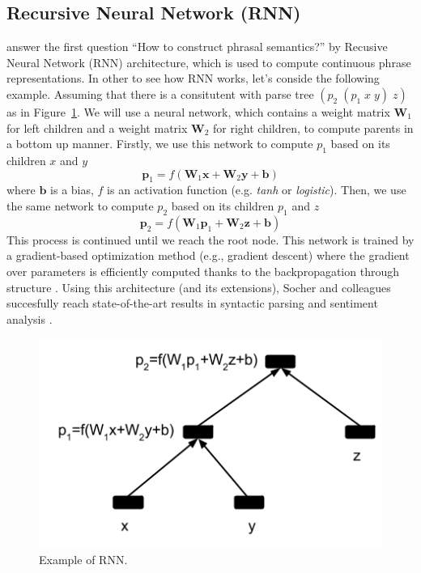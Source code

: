\documentclass[11pt]{article}
\begin{document}
\subsection{Recursive Neural Network (RNN)}
\label{subsection rnn}
\cite{socher_learning_2010} answer the first question ``How to construct phrasal semantics?'' 
by Recusive Neural Network (RNN) architecture, 
which is used to compute continuous phrase representations. In other to see how RNN works, 
let's conside the following example. Assuming that there is a consitutent with parse
tree $(p_2 \; (p_1 \; x \; y) \; z)$ as in Figure~\ref{figure rnn}. We will use a neural network, 
which contains a weight matrix $\mathbf{W}_1$ for left children and a weight matrix $\mathbf{W}_2$ 
for right children, to compute parents in a bottom up manner. Firstly, we use this network 
to compute $p_1$ based on its children $x$ and $y$
\begin{equation}
	\mathbf{p}_1 = f(\mathbf{W}_1 \mathbf{x} + \mathbf{W}_2 \mathbf{y} + \mathbf{b})
\end{equation}
where $\mathbf{b}$ is a bias, $f$ is an activation function (e.g. \textit{tanh} or \textit{logistic}).
Then, we use the same network to compute $p_2$ based on its children $p_1$ and $z$
\begin{equation}
	\mathbf{p}_2 = f(\mathbf{W}_1 \mathbf{p}_1 + \mathbf{W}_2 \mathbf{z} + \mathbf{b})
\end{equation}
This process is continued until we reach the root node.  This network is trained by 
a gradient-based optimization method (e.g., gradient descent) where the gradient 
over parameters is efficiently computed thanks to the backpropagation through structure
\cite{goller_learning_1996}. Using this architecture 
(and its extensions), Socher and colleagues succesfully reach 
state-of-the-art results in syntactic parsing \cite{socher2013parsing} and 
sentiment analysis \cite{socher2013recursive}. 
\begin{figure}
	\center
	\includegraphics[scale=0.5]{RNN.png}
	\caption{Example of RNN.}
	\label{figure rnn}
\end{figure}
\end{document}
